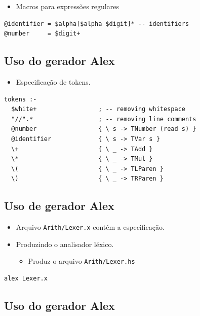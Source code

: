 \documentclass[11pt]{article}
\begin{document}
\begin{itemize}
\item Macros para expressões regulares
\end{itemize}

\begin{verbatim}
@identifier = $alpha[$alpha $digit]* -- identifiers
@number     = $digit+
\end{verbatim}
\subsection*{Uso do gerador Alex}
\label{sec:org6927bbb}

\begin{itemize}
\item Especificação de tokens.
\end{itemize}

\begin{verbatim}
tokens :-
  $white+                 ; -- removing whitespace
  "//".*                  ; -- removing line comments
  @number                 { \ s -> TNumber (read s) }
  @identifier             { \ s -> TVar s }
  \+                      { \ _ -> TAdd }
  \*                      { \ _ -> TMul }
  \(                      { \ _ -> TLParen }
  \)                      { \ _ -> TRParen }
\end{verbatim}
\subsection*{Uso de gerador Alex}
\label{sec:orgfb7075e}

\begin{itemize}
\item Arquivo \texttt{Arith/Lexer.x} contém a especificação.

\item Produzindo o analisador léxico.
\begin{itemize}
\item Produz o arquivo \texttt{Arith/Lexer.hs}
\end{itemize}
\end{itemize}

\begin{verbatim}
alex Lexer.x 
\end{verbatim}
\subsection*{Uso do gerador Alex}
\label{sec:org0f70f56}
\end{document}
